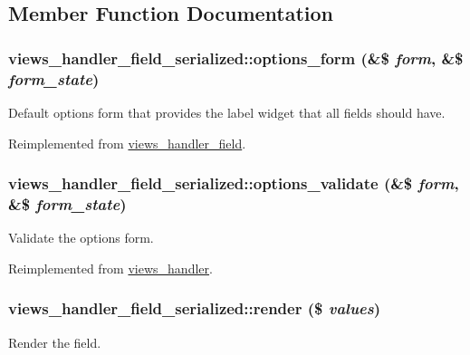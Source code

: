 \subsection{Member Function Documentation}
\hypertarget{classviews__handler__field__serialized_ab940381ab9cf20df4972dbf57e97d04e}{
\subsubsection[{options\_\-form}]{\setlength{\rightskip}{0pt plus 5cm}views\_\-handler\_\-field\_\-serialized::options\_\-form (\&\$ {\em form}, \/  \&\$ {\em form\_\-state})}}
\label{classviews__handler__field__serialized_ab940381ab9cf20df4972dbf57e97d04e}
Default options form that provides the label widget that all fields should have. 

Reimplemented from \hyperlink{classviews__handler__field_a0435d161922b7b4b84f02a2e79bb947a}{views\_\-handler\_\-field}.\hypertarget{classviews__handler__field__serialized_a1ad7ffa8d9ea1cb01fb69c47c29600f1}{
\subsubsection[{options\_\-validate}]{\setlength{\rightskip}{0pt plus 5cm}views\_\-handler\_\-field\_\-serialized::options\_\-validate (\&\$ {\em form}, \/  \&\$ {\em form\_\-state})}}
\label{classviews__handler__field__serialized_a1ad7ffa8d9ea1cb01fb69c47c29600f1}
Validate the options form. 

Reimplemented from \hyperlink{classviews__handler_a831c00b8cd3c667e25db014a3413273c}{views\_\-handler}.\hypertarget{classviews__handler__field__serialized_ad1ab783ff282f7d3af5e93e6debbc176}{
\subsubsection[{render}]{\setlength{\rightskip}{0pt plus 5cm}views\_\-handler\_\-field\_\-serialized::render (\$ {\em values})}}
\label{classviews__handler__field__serialized_ad1ab783ff282f7d3af5e93e6debbc176}
Render the field.


